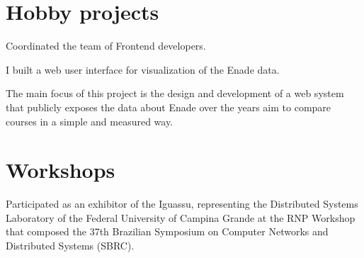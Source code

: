 \documentclass[]{deedy-resume-openfont}
\begin{document}
\begin{minipage}[t]{0.66\textwidth}
\section{Hobby projects}

\vspace{\topsep} %
\begin{tightemize}
\item Coordinated the team of Frontend developers.
\item I built a web user interface for visualization of the Enade data.
\item The main focus of this project is the design and development of a web system that publicly exposes the data about Enade over the years aim to compare courses in a simple and measured way.
\end{tightemize}
\sectionsep

\section{Workshops}

\vspace{\topsep} %
\begin{tightemize}
\item Participated as an exhibitor of the Iguassu, representing the Distributed Systems Laboratory of the Federal University of Campina Grande at the RNP Workshop that composed the 37th Brazilian Symposium on Computer Networks and Distributed Systems (SBRC).
\end{tightemize}
\sectionsep

\sectionsep
\end{minipage} 
\end{document}
